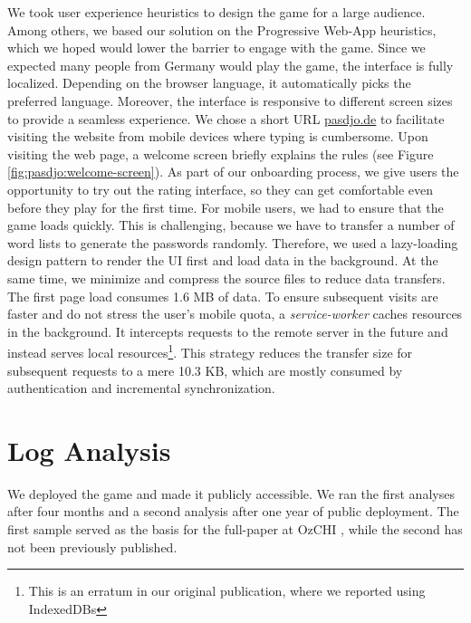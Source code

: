 We took user experience heuristics to design the game for a large audience. Among others, we based our solution on the Progressive Web-App heuristics, which we hoped would lower the barrier to engage with the game. Since we expected many people from Germany would play the game, the interface is fully localized. Depending on the browser language, it automatically picks the preferred language. Moreover, the interface is responsive to different screen sizes to provide a seamless experience. We chose a short URL \url{pasdjo.de} to facilitate visiting the website from mobile devices where typing is cumbersome. Upon visiting the web page, a welcome screen briefly explains the rules (see Figure \ref{fig:pasdjo:welcome-screen}). As part of our onboarding process, we give users the opportunity to try out the rating interface, so they can get comfortable even before they play for the first time. For mobile users, we had to ensure that the game loads quickly. This is challenging, because we have to transfer a number of word lists to generate the passwords randomly. Therefore, we used a lazy-loading design pattern to render the UI first and load data in the background. At the same time, we minimize and compress the source files to reduce data transfers. The first page load consumes 1.6 MB of data. To ensure subsequent visits are faster and do not stress the user's mobile quota, a \textit{service-worker} caches resources in the background. It intercepts requests to the remote server in the future and instead serves local resources\footnote{This is an erratum in our original publication, where we reported using IndexedDBs}. This strategy reduces the transfer size for subsequent requests to a mere 10.3 KB, which are mostly consumed by authentication and incremental synchronization. 

\section{Log Analysis}
We deployed the game and made it publicly accessible. We ran the first analyses after four months and a second analysis after one year of public deployment. The first sample served as the basis for the full-paper at OzCHI \cite{Seitz2017PASDJO}, while the second has not been previously published. 

